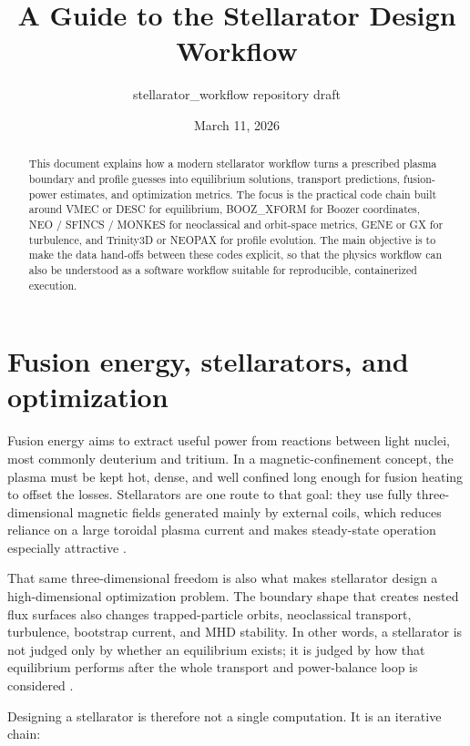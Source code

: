 \documentclass[11pt]{article}
\title{A Guide to the Stellarator Design Workflow}
\author{stellarator\_workflow repository draft}
\date{March 11, 2026}
\begin{document}
\maketitle

\begin{abstract}
This document explains how a modern stellarator workflow turns a prescribed
plasma boundary and profile guesses into equilibrium solutions, transport
predictions, fusion-power estimates, and optimization metrics. The focus is the
practical code chain built around VMEC or DESC for equilibrium, BOOZ\_XFORM
for Boozer coordinates, NEO / SFINCS / MONKES for neoclassical and orbit-space
metrics, GENE or GX for turbulence, and Trinity3D or NEOPAX for profile
evolution. The main objective is to make the data hand-offs between these codes
explicit, so that the physics workflow can also be understood as a software
workflow suitable for reproducible, containerized execution.
\end{abstract}

\tableofcontents

\section{Fusion energy, stellarators, and optimization}

Fusion energy aims to extract useful power from reactions between light nuclei,
most commonly deuterium and tritium. In a magnetic-confinement concept, the
plasma must be kept hot, dense, and well confined long enough for fusion
heating to offset the losses. Stellarators are one route to that goal: they
use fully three-dimensional magnetic fields generated mainly by external coils,
which reduces reliance on a large toroidal plasma current and makes steady-state
operation especially attractive \citep{Helander2014,Endler2021}.

That same three-dimensional freedom is also what makes stellarator design a
high-dimensional optimization problem. The boundary shape that creates nested
flux surfaces also changes trapped-particle orbits, neoclassical transport,
turbulence, bootstrap current, and MHD stability. In other words, a stellarator
is not judged only by whether an equilibrium exists; it is judged by how that
equilibrium performs after the whole transport and power-balance loop is
considered \citep{LandremanPaul2022,Kim2024TurbulenceOpt,BanonNavarro2023}.

Designing a stellarator is therefore not a single computation. It is an
iterative chain:
\end{document}
